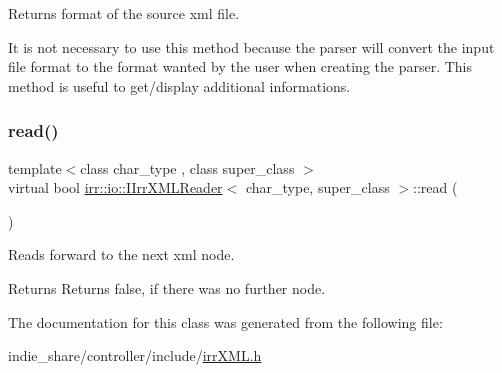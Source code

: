 Returns format of the source xml file. 

It is not necessary to use this method because the parser will convert the input file format to the format wanted by the user when creating the parser. This method is useful to get/display additional informations. \mbox{\label{classirr_1_1io_1_1IIrrXMLReader_a157f458f7dabeeff173f72a0fb443a8e}} 
\subsubsection{\texorpdfstring{read()}{read()}}
{\footnotesize\ttfamily template$<$class char\+\_\+type , class super\+\_\+class $>$ \\
virtual bool \hyperlink{classirr_1_1io_1_1IIrrXMLReader}{irr\+::io\+::\+I\+Irr\+X\+M\+L\+Reader}$<$ char\+\_\+type, super\+\_\+class $>$\+::read (\begin{DoxyParamCaption}{ }\end{DoxyParamCaption})\hspace{0.3cm}{\ttfamily [pure virtual]}}



Reads forward to the next xml node. 

\begin{DoxyReturn}{Returns}
Returns false, if there was no further node. 
\end{DoxyReturn}


The documentation for this class was generated from the following file\+:\begin{DoxyCompactItemize}
\item 
indie\+\_\+share/controller/include/\hyperlink{irrXML_8h}{irr\+X\+M\+L.\+h}\end{DoxyCompactItemize}
